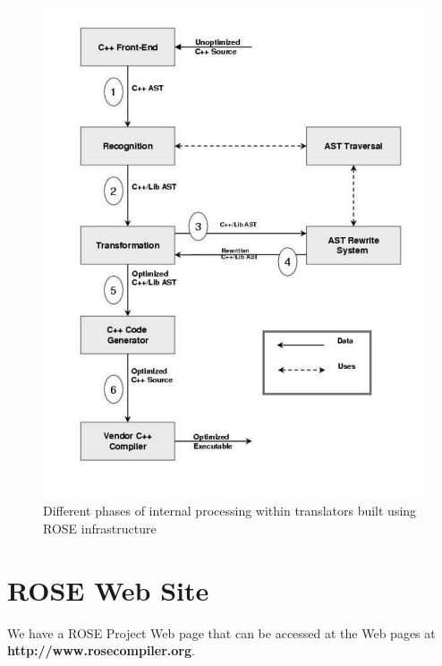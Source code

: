 \begin{figure}

\includegraphics[scale=0.5]{rose-processing-phases}
\caption{Different phases of internal processing within translators built using ROSE infrastructure}
\label{introduction:phases}
\end{figure}



\section{ROSE Web Site}
    We have a ROSE Project Web page that can be accessed at the 
Web pages at
{\bf http://www.rosecompiler.org}.

